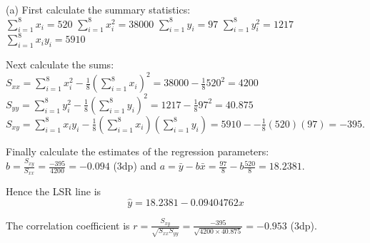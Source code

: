 \documentclass[bigtut]{tutorial}\usepackage[]{graphicx}\usepackage[]{color}
\begin{document}
\begin{tutorial}
\begin{questions}

\begin{solution}

(a)  
First calculate the summary statistics: \\
$\sum_{i=1}^{8} x_{i} = 520$
$\sum_{i=1}^{8} x_{i}^2 = 38000$
$\sum_{i=1}^{8} y_{i} = 97$
$\sum_{i=1}^{8} y_{i}^2 = 1217$ 
$\sum_{i=1}^{8} x_{i} y_{i} = 5910$ 

\vspace{.5cm}
Next calculate the sums: \\
$S_{xx} = \sum_{i=1}^{8} x_{i}^2 - \frac{1}{8} (\sum_{i=1}^{8} x_{i})^2  = 38000 - \frac{1}{8} 520^2 = 4200$ \\
$S_{yy} = \sum_{i=1}^{8} y_{i}^2 - \frac{1}{8} (\sum_{i=1}^{8} y_{i})^2  = 1217 - \frac{1}{8} 97^2 = 40.875$ \\
$S_{xy} = \sum_{i=1}^{8} x_{i} y_{i} - \frac{1}{8} (\sum_{i=1}^{8} x_{i})(\sum_{i=1}^{8} y_{i})  = 5910-- \frac{1}{8} (520)(97) = -395$. 

\vspace{.5cm}
Finally calculate the estimates of the regression parameters: \\
$b = \frac{ S_{xy} }{ S_{xx}} = \frac{-395}{4200} = -0.094$ (3dp) and $a = \bar{y} - b \bar{x} = \frac{97}{8} - b \frac{520}{8} = 18.2381$. 

\vspace{.5cm}
Hence the LSR line is  
\[ \hat{y} = 18.2381 -0.09404762x \]

The correlation coefficient is $r = \frac{S_{xy}}{\sqrt{S_{xx} S_{yy}}} = \frac{-395}{\sqrt{4200 \times 40.875}} = -0.953 $ (3dp). \\


\end{solution}
\end{questions}
\end{tutorial}
\end{document}
